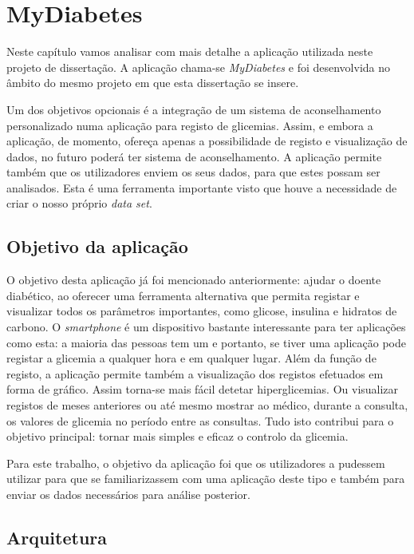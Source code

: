 \chapter{MyDiabetes}\label{chap:syst}

Neste capítulo vamos analisar com mais detalhe a aplicação utilizada neste projeto de dissertação. A aplicação chama-se \textit{MyDiabetes} e foi desenvolvida no âmbito do mesmo projeto em que esta dissertação se insere. 

Um dos objetivos opcionais é a integração de um sistema de aconselhamento personalizado numa aplicação para registo de glicemias. Assim, e embora a aplicação, de momento, ofereça apenas a possibilidade de registo e visualização de dados, no futuro poderá ter sistema de aconselhamento. A aplicação permite também que os utilizadores enviem os seus dados, para que estes possam ser analisados. Esta é uma ferramenta importante visto que houve a necessidade de criar o nosso próprio \textit{data set}. 


\section{Objetivo da aplicação}

O objetivo desta aplicação já foi mencionado anteriormente: ajudar o doente diabético, ao oferecer uma ferramenta alternativa que permita registar e visualizar todos os parâmetros importantes, como glicose, insulina e hidratos de carbono. O \textit{smartphone} é um dispositivo bastante interessante para ter aplicações como esta: a maioria das pessoas tem um e portanto, se tiver uma aplicação pode registar a glicemia a qualquer hora e em qualquer lugar.
Além da função de registo, a aplicação permite também a visualização dos registos efetuados em forma de gráfico. Assim torna-se mais fácil detetar hiperglicemias. Ou visualizar registos de meses anteriores ou até mesmo mostrar ao médico, durante a consulta, os valores de glicemia no período entre as consultas.
Tudo isto contribui para o objetivo principal: tornar mais simples e eficaz o controlo da glicemia. 

Para este trabalho, o objetivo da aplicação foi que os utilizadores a pudessem utilizar para que se familiarizassem com uma aplicação deste tipo e também para enviar os dados necessários para análise posterior.

\section{Arquitetura}


